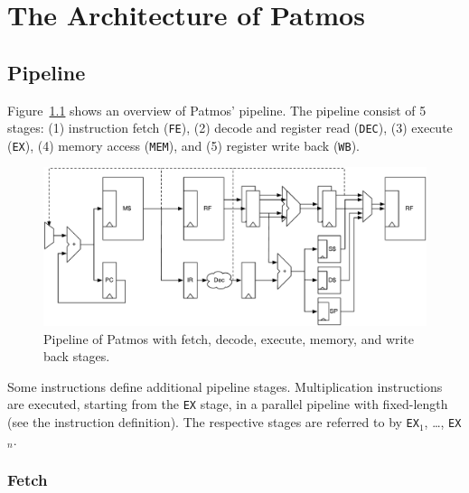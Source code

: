 \documentclass[a4paper,fontsize=10pt,twoside,DIV15,BCOR12mm,headinclude=true,footinclude=false,pagesize,bibtotoc]{scrbook}
\newcommand{\todo}[1]{{\emph{TODO: #1}}}
\newcommand{\comment}[3]{

\textsf{\textbf{#1}} {\color{#3}#2}}
\newcommand{\martin}[1]{\comment{Martin}{#1}{Blue}}
\renewcommand{\martin}[1]{}
\begin{document}
\martin{TODO: The instruction description with the individual pipeline stages shall be
rewritten to reflect the actual simulator and hardware implementation of Patmos.
E.g. predicate registers are *not* read in the decode stage, but directly in EX.
Reading in decode would mean a one cycle generate use delay.}


\chapter{The Architecture of Patmos}
\label{sec:arch}

\section{Pipeline}

Figure~\ref{fig:pipeline} shows an overview of Patmos' pipeline. The pipeline
consist of 5 stages: (1) instruction fetch (\texttt{FE}), (2) decode and
register read (\texttt{DEC}), (3) execute (\texttt{EX}), (4) memory access (\texttt{MEM}), and (5) register write  back (\texttt{WB}).

\begin{figure}
    \centering
    \includegraphics[width=\textwidth]{fig/pipeline}
    \caption{Pipeline of Patmos with fetch, decode, execute, memory, and write back stages.}\label{fig:pipeline}
\end{figure}

Some instructions define additional pipeline stages. Multiplication instructions
are executed, starting from the \texttt{EX} stage, in a parallel pipeline with
fixed-length (see the instruction definition). The respective stages are
referred to by \texttt{EX$_1$}, \dots, \texttt{EX$_n$}.

\martin{\todo{A more detailed description of the pipeline stages, as the individual
4 stage description is gone.} Here a start:}

\subsection{Fetch}
\end{document}
